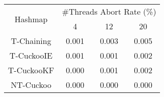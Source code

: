 \begin{tabular}{|c|c|c|c|}
\hline
\multirow{2}{*}{Hashmap} & \multicolumn{3}{c|}{\#Threads Abort Rate (\%)}\\\cline{2-4}& 4 & 12 & 20\\
\hline
\hline
T-Chaining & 0.001 & 0.003 & 0.005\\
T-CuckooIE & 0.001 & 0.001 & 0.002\\
T-CuckooKF & 0.000 & 0.001 & 0.002\\
NT-Cuckoo & 0.000 & 0.000 & 0.000\\
\hline
\end{tabular}
